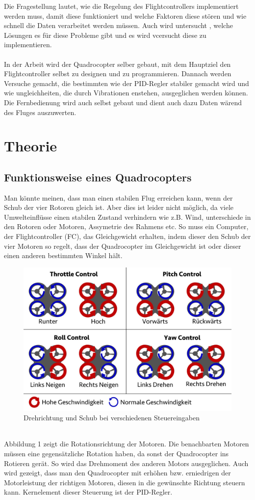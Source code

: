 \documentclass[12pt,a4paper, ngerman]{article}
\begin{document}
\fi
Die Fragestellung lautet, wie die Regelung des Flightcontrollers implementiert werden muss, damit diese funktioniert und welche Faktoren diese stören und wie schnell die Daten verarbeitet werden müssen. Auch wird untersucht , welche Lösungen es für diese Probleme gibt und es wird vcersucht diese zu implementieren. \\ \\
In der Arbeit wird der Quadrocopter selber gebaut, mit dem Hauptziel den Flightcontroller selbst zu designen und zu programmieren. Dannach werden Versuche gemacht, die bestimmten wie der PID-Regler stabiler gemacht wird und wie ungleichheiten, die durch Vibrationen enstehen, ausgeglichen werden können. Die Fernbedienung wird auch selbst gebaut und dient auch dazu Daten wärend des Fluges auszuwerten. 
\newpage
\section{Theorie}
\subsection{Funktionsweise eines Quadrocopters}
Man könnte meinen, dass man einen stabilen Flug erreichen kann, wenn der Schub der vier Rotoren gleich ist. Aber dies ist leider nicht möglich, da viele Umwelteinflüsse einen stabilen Zustand verhindern wie z.B. Wind, unterschiede in den Rotoren oder Motoren, Assymetrie des Rahmens etc. So muss ein Computer, der Flightcontroller (FC), das Gleichgewicht erhalten, indem dieser den Schub der vier Motoren so regelt, dass der Quadrocopter im Gleichgewicht ist oder dieser einen anderen bestimmten Winkel hält.\\
\begin{figure}[h]
\centering
\includegraphics[width=\textwidth]{MotionDE.jpg}
\caption[\url{http://fpvracing.ch/img/cms/MotionDE.jpg}]{Drehrichtung und Schub bei verschiedenen Steuereingaben }
\end{figure}\\
Abbildung 1 zeigt die Rotationsrichtung der Motoren. Die benachbarten Motoren müssen eine gegensätzliche Rotation haben, da sonst der Quadrocopter ins Rotieren gerät. So wird das Drehmoment des anderen Motors ausgeglichen. Auch wird gezeigt, dass man den Quadrocopter mit erhöhen bzw. erniedrigen der Motorleistung der richtigen Motoren, diesen in die gewünschte Richtung steuern kann. Kernelement dieser Steuerung ist der PID-Regler.
\newpage
\end{document}
